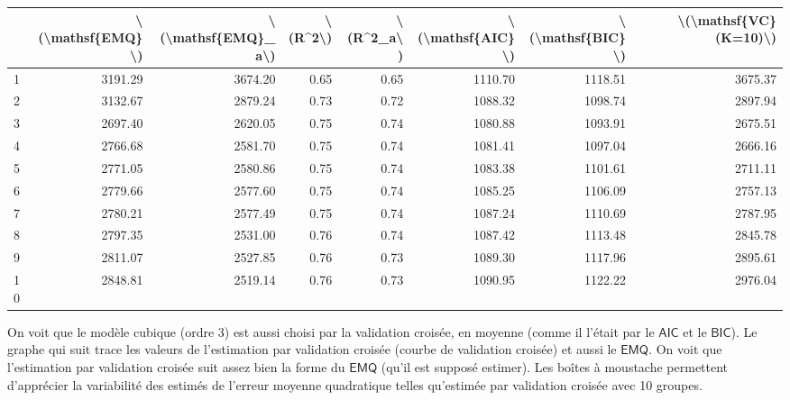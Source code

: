 \documentclass[
]{book}
\theoremstyle{definition}
\theoremstyle{definition}
\theoremstyle{definition}
\theoremstyle{remark}
\begin{document}
\begin{tabular}{l|r|r|r|r|r|r|r}
\hline
  & \textbackslash{}(\textbackslash{}mathsf\{EMQ\}\textbackslash{}) & \textbackslash{}(\textbackslash{}mathsf\{EMQ\}\_a\textbackslash{}) & \textbackslash{}(R\textasciicircum{}2\textbackslash{}) & \textbackslash{}(R\textasciicircum{}2\_a\textbackslash{}) & \textbackslash{}(\textbackslash{}mathsf\{AIC\}\textbackslash{}) & \textbackslash{}(\textbackslash{}mathsf\{BIC\}\textbackslash{}) & \textbackslash{}(\textbackslash{}mathsf\{VC\} (K=10)\textbackslash{})\\
\hline
1 & 3191.29 & 3674.20 & 0.65 & 0.65 & 1110.70 & 1118.51 & 3675.37\\
\hline
2 & 3132.67 & 2879.24 & 0.73 & 0.72 & 1088.32 & 1098.74 & 2897.94\\
\hline
3 & 2697.40 & 2620.05 & 0.75 & 0.74 & 1080.88 & 1093.91 & 2675.51\\
\hline
4 & 2766.68 & 2581.70 & 0.75 & 0.74 & 1081.41 & 1097.04 & 2666.16\\
\hline
5 & 2771.05 & 2580.86 & 0.75 & 0.74 & 1083.38 & 1101.61 & 2711.11\\
\hline
6 & 2779.66 & 2577.60 & 0.75 & 0.74 & 1085.25 & 1106.09 & 2757.13\\
\hline
7 & 2780.21 & 2577.49 & 0.75 & 0.74 & 1087.24 & 1110.69 & 2787.95\\
\hline
8 & 2797.35 & 2531.00 & 0.76 & 0.74 & 1087.42 & 1113.48 & 2845.78\\
\hline
9 & 2811.07 & 2527.85 & 0.76 & 0.73 & 1089.30 & 1117.96 & 2895.61\\
\hline
10 & 2848.81 & 2519.14 & 0.76 & 0.73 & 1090.95 & 1122.22 & 2976.04\\
\hline
\end{tabular}

On voit que le modèle cubique (ordre 3) est aussi choisi par la validation croisée, en moyenne (comme il l'était par le \(\mathsf{AIC}\) et le \(\mathsf{BIC}\)). Le graphe qui suit trace les valeurs de l'estimation par validation croisée (courbe de validation croisée) et aussi le \(\mathsf{EMQ}\). On voit que l'estimation par validation croisée suit assez bien la forme du \(\mathsf{EMQ}\) (qu'il est supposé estimer). Les boîtes à moustache permettent d'apprécier la variabilité des estimés de l'erreur moyenne quadratique telles qu'estimée par validation croisée avec 10 groupes.
\end{document}
